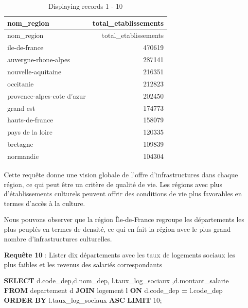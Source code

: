 \documentclass[mstat,12pt]{unswthesis}
\newenvironment{Shaded}{\begin{snugshade}}{\end{snugshade}}
\newcommand{\DecValTok}[1]{\textcolor[rgb]{0.00,0.00,0.81}{#1}}
\newcommand{\KeywordTok}[1]{\textcolor[rgb]{0.13,0.29,0.53}{\textbf{#1}}}
\newcommand{\NormalTok}[1]{#1}
\newcommand{\OperatorTok}[1]{\textcolor[rgb]{0.81,0.36,0.00}{\textbf{#1}}}
\begin{document}
\begin{longtable}[]{@{}lr@{}}
\caption{Displaying records 1 - 10}\tabularnewline
\toprule\noalign{}
nom\_region & total\_etablissements \\
\midrule\noalign{}
\endfirsthead
\toprule\noalign{}
nom\_region & total\_etablissements \\
\midrule\noalign{}
\endhead
\bottomrule\noalign{}
\endlastfoot
ile-de-france & 470619 \\
auvergne-rhone-alpes & 287141 \\
nouvelle-aquitaine & 216351 \\
occitanie & 212823 \\
provence-alpes-cote d'azur & 202450 \\
grand est & 174773 \\
hauts-de-france & 158079 \\
pays de la loire & 120335 \\
bretagne & 109839 \\
normandie & 104304 \\
\end{longtable}

\medskip

Cette requête donne une vision globale de l'offre d'infrastructures dans
chaque région, ce qui peut être un critère de qualité de vie. Les
régions avec plus d'établissements culturels peuvent offrir des
conditions de vie plus favorables en termes d'accès à la culture.

Nous pouvons observer que la région Île-de-France regroupe les
départements les plus peuplés en termes de densité, ce qui en fait la
région avec le plus grand nombre d'infrastructures culturelles.

\medskip

\textbf{Requête 10} : Lister dix départements avec les taux de logements
sociaux les plus faibles et les revenus des salariés correspondants

\begin{Shaded}
\begin{Highlighting}[]
\KeywordTok{SELECT}\NormalTok{ d.code\_dep,d.nom\_dep, l.taux\_log\_sociaux ,d.montant\_salarie}
\KeywordTok{FROM}\NormalTok{ departement d}
\KeywordTok{JOIN}\NormalTok{ logement l }\KeywordTok{ON}\NormalTok{ d.code\_dep }\OperatorTok{=}\NormalTok{ l.code\_dep}
\KeywordTok{ORDER} \KeywordTok{BY}\NormalTok{ l.taux\_log\_sociaux }\KeywordTok{ASC}
\KeywordTok{LIMIT} \DecValTok{10}\NormalTok{;}
\end{Highlighting}
\end{Shaded}
\end{document}
